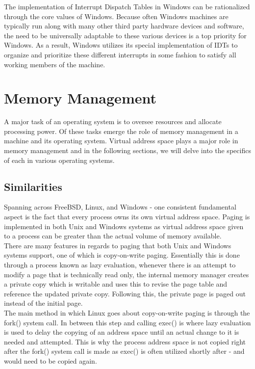 \documentclass[letterpaper,10pt,titlepage]{article}
\begin{document}
The implementation of Interrupt Dispatch Tables in Windows can be rationalized through the core values of Windows.  Because often Windows machines are typically run along with many other third party hardware devices and software, the need to be universally adaptable to these various devices is a top priority for Windows.  As a result, Windows utilizes its special implementation of IDTs to organize and prioritize these different interrupts in some fashion to satisfy all working members of the machine.\\

\section{Memory Management}

A major task of an operating system is to oversee resources and allocate processing power.  Of these tasks emerge the role of memory management in a machine and its operating system.  Virtual address space plays a major role in memory management and in the following sections, we will delve into the specifics of each in various operating systems.\\

\subsection{Similarities}

Spanning across FreeBSD, Linux, and Windows - one consistent fundamental aspect is the fact that every process owns its own virtual address space.  Paging is implemented in both Unix and Windows systems as virtual address space given to a process can be greater than the actual volume of memory available.\\

There are many features in regards to paging that both Unix and Windows systems support, one of which is copy-on-write paging.   Essentially this is done through a process known as lazy evaluation, whenever there is an attempt to modify a page that is technically read only, the internal memory manager creates a private copy which is writable and uses this to revise the page table and reference the updated private copy.\cite{lkd12}  Following this, the private page is paged out instead of the initial page.\\

The main method in which Linux goes about copy-on-write paging is through the fork() system call.  In between this step and calling exec() is where lazy evaluation is used to delay the copying of an address space until an actual change to it is needed and attempted.  This is why the process address space is not copied right after the fork() system call is made as exec() is often utilized shortly after - and would need to be copied again.\cite{lkd12}\\
\end{document}
